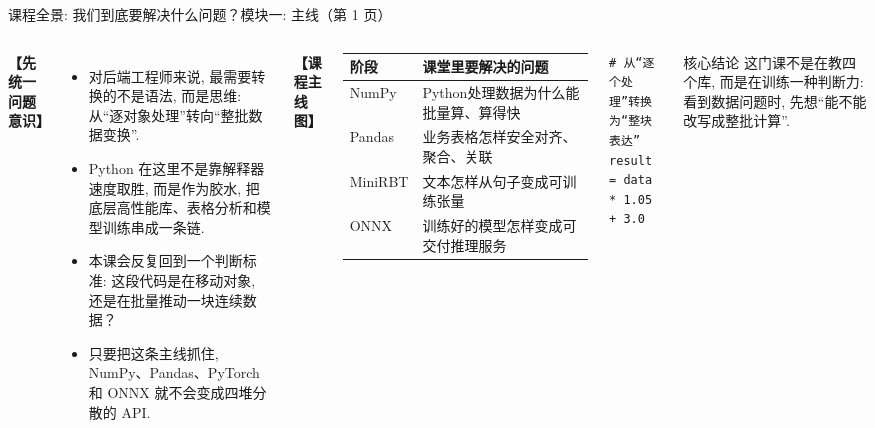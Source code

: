 \documentclass[aspectratio=169,9pt]{beamer}
\begin{document}
\begin{frame}[fragile]{课程全景: 我们到底要解决什么问题？}{模块一: 主线（第 1 页）}
\begin{columns}[T]
    \textbf{【先统一问题意识】}
    \begin{itemize}
        \item 对后端工程师来说, 最需要转换的不是语法, 而是思维: 从“逐对象处理”转向“整批数据变换”.
        \item Python 在这里不是靠解释器速度取胜, 而是作为胶水, 把底层高性能库、表格分析和模型训练串成一条链.
        \item 本课会反复回到一个判断标准: 这段代码是在移动对象, 还是在批量推动一块连续数据？
        \item 只要把这条主线抓住, NumPy、Pandas、PyTorch 和 ONNX 就不会变成四堆分散的 API.
    \end{itemize}

    \textbf{【课程主线图】}
    \vspace{1.5mm}
    
    {\scriptsize %
    \renewcommand{\arraystretch}{1.2} %
    \begin{tabular}{@{}p{1.3cm}p{3.9cm}@{}}
        \toprule
        \textbf{阶段} & \textbf{课堂里要解决的问题} \\
        \midrule
        NumPy   & Python处理数据为什么能批量算、算得快 \\
        Pandas  & 业务表格怎样安全对齐、聚合、关联 \\
        MiniRBT & 文本怎样从句子变成可训练张量 \\
        ONNX    & 训练好的模型怎样变成可交付推理服务 \\
        \bottomrule
    \end{tabular}
    }
    \vspace{2mm}
\begin{lstlisting}
# 从“逐个处理”转换为“整块表达”
result = data * 1.05 + 3.0
\end{lstlisting}
    \begin{alertblock}{核心结论}
        \scriptsize 这门课不是在教四个库, 而是在训练一种判断力: 看到数据问题时, 先想“能不能改写成整批计算”.
    \end{alertblock}
\end{columns}
\end{frame}
\end{document}
